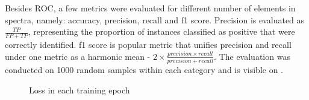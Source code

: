 Besides ROC, a few metrics were evaluated for different number of elements in spectra, namely: accuracy, precision, recall and f1 score. 
Precision is evaluated as $\frac{TP}{FP+TP}$, representing the proportion of instances classified as positive that were correctly identified.
f1 score is popular metric that unifies precision and recall under one metric as a harmonic mean -  $2\times\frac{precision \times recall}{precision + recall}$.
The evaluation was conducted on 1000 random samples within each category and is visible on .

\begin{figure}[htbp!]
  \centering
  
  \caption{Loss in each training epoch}
  \label{fig:vit-scores}
\end{figure}
